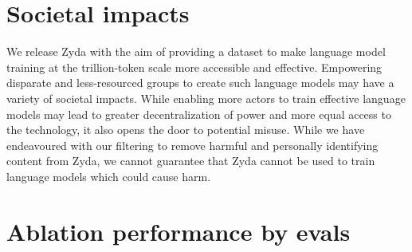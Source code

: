 \documentclass{article}
\begin{document}
\section{Societal impacts}
We release Zyda with the aim of providing a dataset to make language model training at the trillion-token scale more accessible and effective. Empowering disparate and less-resourced groups to create such language models may have a variety of societal impacts. While enabling more actors to train effective language models may lead to greater decentralization of power and more equal access to the technology, it also opens the door to potential misuse. While we have endeavoured with our filtering to remove harmful and personally identifying content from Zyda, we cannot guarantee that Zyda cannot be used to train language models which could cause harm.

\newpage

\section{Ablation performance by evals}
\end{document}
